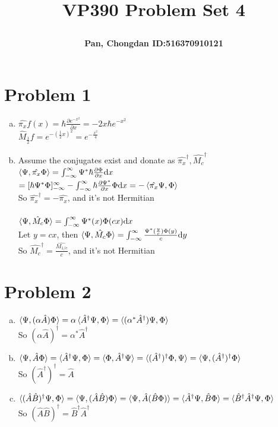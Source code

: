 \documentclass[a4paper]{article}
\title{\Large \textbf{VP390 Problem Set 4}\\
\author{\textbf{Pan, Chongdan ID:516370910121}\\
}
}
\begin{document}
\maketitle
\section{Problem 1}
\begin{enumerate}[(a)]
    \item $\hat{\pi_x}f(x)=\hbar\frac{\partial e^{-x^2}}{\partial x}=-2x\hbar e^{-x^2}$
    \\$\hat{M}_{\frac{1}{2}}f=e^{-(\frac{1}{2}x)^2}=e^{-\frac{x^2}{4}}$
    \item Assume the conjugates exist and donate as $\hat{\pi_x}^\dagger,\hat{M_c}^\dagger$
    \\$\braket{\Psi,\hat{\pi_x}\Phi}=\int_{-\infty}^\infty\Psi^*\hbar\frac{\partial\Phi}{\partial x}\mathrm{d}x$
    \\$=[\hbar\Psi^*\Phi]^\infty_{-\infty}-\int_{-\infty}^\infty\hbar\frac{\partial\Psi^*}{\partial x}\Phi\mathrm{d}x=-\braket{\hat{\pi_x}\Psi,\Phi}$
    \\So $\hat{\pi_x}^\dagger=-\hat{\pi_x}$, and it's not Hermitian
    \\\\$\braket{\Psi,\hat{M_c}\Phi}=\int_{-\infty}^\infty\Psi^*(x)\Phi(cx)\mathrm{d}x$
    \\Let $y=cx$, then $\braket{\Psi,\hat{M_c}\Phi}=\int_{-\infty}^\infty\frac{\Psi^*(\frac{y}{c})\Phi(y)}{c}\mathrm{d}y$
    \\So $\hat{M_c}^\dagger=\frac{\hat{M_{1/c}}}{c}$, and it's not Hermitian
\end{enumerate}
\section{Problem 2}
\begin{enumerate}[(a)]
    \item $\braket{\Psi,(\alpha\hat{A})\Phi}=\alpha\braket{\hat{A}^\dagger\Psi,\Phi}=\braket{(\alpha^*\hat{A}^\dagger)\Psi,\Phi}$
    \\So $(\alpha\hat{A})^\dagger=\alpha^*\hat{A}^\dagger$
    \item $\braket{\Psi,\hat{A}\Phi}=\braket{\hat{A}^\dagger\Psi,\Phi}=\braket{\Phi,\hat{A}^\dagger\Psi}=\braket{(\hat{A}^\dagger)^\dagger\Phi,\Psi}=\braket{\Psi,(\hat{A}^\dagger)^\dagger\Phi}$
    \\So $(\hat{A}^\dagger)^\dagger=\hat{A}$
    \item $\braket{(\hat{A}\hat{B})^\dagger\Psi,\Phi}=\braket{\Psi,(\hat{A}\hat{B})\Phi}=\braket{\Psi,\hat{A}(\hat{B}\Phi)}=\braket{\hat{A}^\dagger\Psi,\hat{B}\Phi}=\braket{\hat{B}^\dagger\hat{A}^\dagger\Psi,\Phi}$
    \\So $(\hat{A}\hat{B})^\dagger=\hat{B}^\dagger\hat{A}^\dagger$
\end{enumerate}
\end{document}
